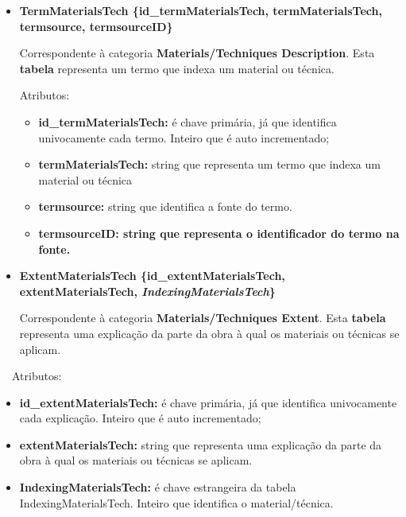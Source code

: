 \documentclass[letterpaper]{article}
\newcommand\textstyleStrongEmphasis[1]{\textbf{#1}}
\newcommand\liststyleLi{%
\renewcommand\labelitemi{{\textbullet}}
\renewcommand\labelitemii{[27A2?]}
\renewcommand\labelitemiii{{\textbullet}}
\renewcommand\labelitemiv{{\textbullet}}
}
\newcommand\liststyleLvii{%
\renewcommand\labelitemi{[27A2?]}
\renewcommand\labelitemii{[27A2?]}
\renewcommand\labelitemiii{[27A2?]}
\renewcommand\labelitemiv{[27A2?]}
}
\begin{document}
\liststyleLi
\begin{itemize}
\item {\bfseries
TermMaterialsTech\textmd{ \{}\textmd{id\_termMaterialsTech}\textmd{,
termMaterialsTech, termsource, termsourceID\}}}

\foreignlanguage{english}{Correspondente \`a categoria
}\foreignlanguage{english}{\textbf{Materials/Techniques
Description}}\foreignlanguage{english}{. Esta
}\textstyleStrongEmphasis{\foreignlanguage{english}{\textmd{tabela}}}\foreignlanguage{english}{
representa }\foreignlanguage{english}{um termo que indexa um material
ou t\'ecnica.}


\bigskip

{
Atributos:}

\begin{itemize}
\item {
\textbf{id\_termMaterialsTech:} \'e chave prim\'aria, j\'a que
identifica univocamente cada termo. Inteiro que \'e auto incrementado;}
\item {
\textbf{termMaterialsTech:} string que representa um termo que indexa um
material ou t\'ecnica}
\item {
\textbf{termsource:} string que identifica a fonte do termo.}
\item {\bfseries
termsourceID:\textmd{ string que representa o identificador do termo na
fonte.}}
\end{itemize}

\bigskip
\item {\bfseries
ExtentMaterialsTech\textmd{ \{}\textmd{id\_extentMaterialsTech}\textmd{,
extentMaterialsTech,
}\textmd{\textit{IndexingMaterialsTech}}\textmd{\}}}

\foreignlanguage{english}{Correspondente \`a categoria
}\foreignlanguage{english}{\textbf{Materials/Techniques
Extent}}\foreignlanguage{english}{. Esta
}\textstyleStrongEmphasis{\foreignlanguage{english}{\textmd{tabela}}}\foreignlanguage{english}{
representa uma explica\c{c}\~ao da parte da obra \`a qual os materiais
ou t\'ecnicas se aplicam.}
\end{itemize}

\bigskip

{
\ \ Atributos:}

\liststyleLvii
\begin{itemize}
\item {
\textbf{id\_extentMaterialsTech:} \'e chave prim\'aria, j\'a que
identifica univocamente cada explica\c{c}\~ao. Inteiro que \'e auto
incrementado;}
\item {
\textbf{extentMaterialsTech:} string que representa uma explica\c{c}\~ao
da parte da obra \`a qual os materiais ou t\'ecnicas se aplicam.}
\item {
\textbf{IndexingMaterialsTech:}\textit{ }\'e chave estrangeira da tabela
IndexingMaterialsTech. Inteiro que identifica o material/t\'ecnica.}
\end{itemize}
\end{document}
